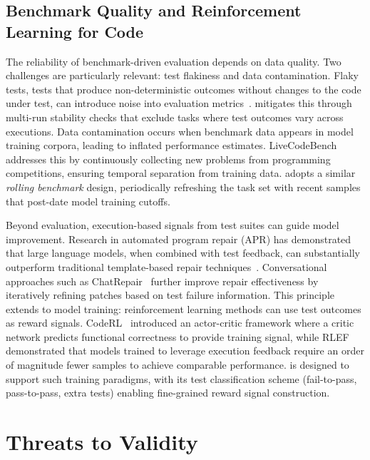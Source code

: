 \subsection{Benchmark Quality and Reinforcement Learning for Code}

The reliability of benchmark-driven evaluation depends on data quality. Two challenges are particularly relevant: test flakiness and data contamination. Flaky tests, tests that produce non-deterministic outcomes without changes to the code under test, can introduce noise into evaluation metrics~\cite{parrySurveyFlakyTests2021}. \benchmark{} mitigates this through multi-run stability checks that exclude tasks where test outcomes vary across executions. Data contamination occurs when benchmark data appears in model training corpora, leading to inflated performance estimates. LiveCodeBench~\cite{jainLiveCodeBenchHolisticContamination2024} addresses this by continuously collecting new problems from programming competitions, ensuring temporal separation from training data. \benchmark{} adopts a similar \emph{rolling benchmark} design, periodically refreshing the task set with recent samples that post-date model training cutoffs.

Beyond evaluation, execution-based signals from test suites can guide model improvement. Research in automated program repair (APR) has demonstrated that large language models, when combined with test feedback, can substantially outperform traditional template-based repair techniques~\cite{xiaAutomatedProgramRepair2023}. Conversational approaches such as ChatRepair~\cite{xiaAutomatedProgramRepair2024} further improve repair effectiveness by iteratively refining patches based on test failure information. This principle extends to model training: reinforcement learning methods can use test outcomes as reward signals. CodeRL~\cite{leCodeRLMasteringCode2022} introduced an actor-critic framework where a critic network predicts functional correctness to provide training signal, while RLEF~\cite{gehringRLEFGroundingCode2025} demonstrated that models trained to leverage execution feedback require an order of magnitude fewer samples to achieve comparable performance. \benchmark{} is designed to support such training paradigms, with its test classification scheme (fail-to-pass, pass-to-pass, extra tests) enabling fine-grained reward signal construction.

\section{Threats to Validity}
\label{sec:limitations}

